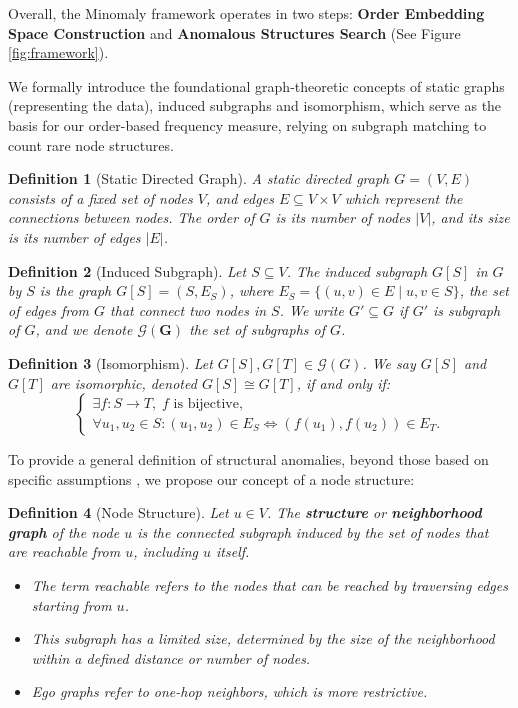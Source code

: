 \documentclass[pdflatex,sn-mathphys-num]{sn-jnl}%
\theoremstyle{thmstyleone}%
\theoremstyle{thmstyletwo}%
\theoremstyle{thmstylethree}%
\newtheorem{definition}{Definition}%
\begin{document}
Overall, the Minomaly framework operates in two steps: \textbf{Order Embedding Space Construction} and \textbf{Anomalous Structures Search} (See Figure \ref{fig:framework}).

We formally introduce the foundational graph-theoretic concepts of static graphs (representing the data), induced subgraphs and isomorphism, which serve as the basis for our order-based frequency measure, relying on subgraph matching to count rare node structures.

\begin{definition}[Static Directed Graph]
A static directed graph $G = (V, E)$ consists of a fixed set of nodes $V$, and edges $E \subseteq V \times V$ which represent the connections between nodes.
The order of $G$ is its number of nodes $|V|$, and its size is its number of edges $|E|$.
\label{def:graph}
\end{definition}

\begin{definition}[Induced Subgraph]
Let $S \subseteq V$. The induced subgraph $G[S]$ in $G$ by $S$ is the graph $G[S] = (S, E_S)$, where $E_S = \{(u, v) \in E \mid u, v \in S\}$, the set of edges from $G$ that connect two nodes in $S$. We write $G' \subseteq G$ if $G'$ is subgraph of $G$, and we denote $\bm{\mathcal{G}(G)}$ the set of subgraphs of $G$.
\end{definition}

\begin{definition}[Isomorphism]
Let $G[S], G[T] \in \mathcal{G}(G)$. We say $G[S]$ and $G[T]$ are isomorphic, denoted $G[S] \cong G[T]$, if and only if:
\[
\begin{cases}
    \exists f: S \to T, \; f \text{ is bijective}, \\
    \forall u_1, u_2 \in S: (u_1, u_2) \in E_S \iff (f(u_1), f(u_2)) \in E_T.
\end{cases}
\]
\label{def:isomorphism}
\end{definition}

To provide a general definition of structural anomalies, beyond those based on specific assumptions \cite{NEURIPS2022-acc1ec4a,bandyopadhyay2020outlier,xu2022contrastive,yuan2024higherorder}, we propose our concept of a node structure:

\begin{definition}[Node Structure]
Let $u \in V$. The \textbf{structure} or \textbf{neighborhood graph} of the node $u$ is the connected subgraph induced by the set of nodes that are reachable from $u$, including $u$ itself.
\begin{itemize}
    \item The term \textit{reachable} refers to the nodes that can be reached by traversing edges starting from $u$.
    \item This subgraph has a limited size, determined by the size of the neighborhood within a defined distance or number of nodes.
    \item Ego graphs refer to one-hop neighbors, which is more restrictive.
\end{itemize}
\end{definition}
\end{document}
